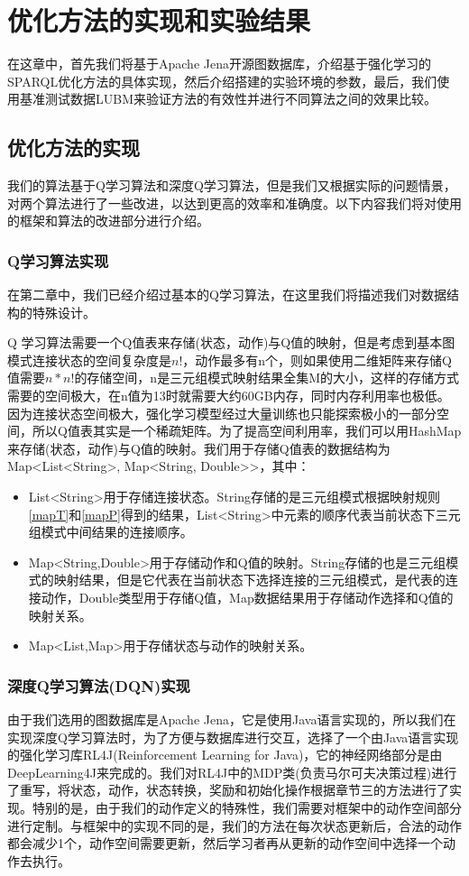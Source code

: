 \chapter{优化方法的实现和实验结果}
在这章中，首先我们将基于Apache Jena开源图数据库，介绍基于强化学习的SPARQL优化方法的具体实现，然后介绍搭建的实验环境的参数，最后，我们使用基准测试数据LUBM来验证方法的有效性并进行不同算法之间的效果比较。
\section{优化方法的实现}
我们的算法基于Q学习算法和深度Q学习算法，但是我们又根据实际的问题情景，对两个算法进行了一些改进，以达到更高的效率和准确度。以下内容我们将对使用的框架和算法的改进部分进行介绍。
\subsection{Q学习算法实现}
在第二章中，我们已经介绍过基本的Q学习算法，在这里我们将描述我们对数据结构的特殊设计。

Q 学习算法需要一个Q值表来存储(状态，动作)与Q值的映射，但是考虑到基本图模式连接状态的空间复杂度是$n!$，动作最多有n个，则如果使用二维矩阵来存储Q值需要$n*n!$的存储空间，n是三元组模式映射结果全集M的大小，这样的存储方式需要的空间极大，在n值为13时就需要大约60GB内存，同时内存利用率也极低。因为连接状态空间极大，强化学习模型经过大量训练也只能探索极小的一部分空间，所以Q值表其实是一个稀疏矩阵。为了提高空间利用率，我们可以用HashMap来存储(状态，动作)与Q值的映射。我们用于存储Q值表的数据结构为Map<List<String>, Map<String, Double>>，其中：
\begin{itemize}
    \item List<String>用于存储连接状态。String存储的是三元组模式根据映射规则\ref{mapT}和\ref{mapP}得到的结果，List<String>中元素的顺序代表当前状态下三元组模式中间结果的连接顺序。
    \item Map<String,Double>用于存储动作和Q值的映射。String存储的也是三元组模式的映射结果，但是它代表在当前状态下选择连接的三元组模式，是代表的连接动作，Double类型用于存储Q值，Map数据结果用于存储动作选择和Q值的映射关系。
    \item Map<List,Map>用于存储状态与动作的映射关系。
\end{itemize}

\subsection{深度Q学习算法(DQN)实现}
由于我们选用的图数据库是Apache Jena，它是使用Java语言实现的，所以我们在实现深度Q学习算法时，为了方便与数据库进行交互，选择了一个由Java语言实现的强化学习库RL4J(Reinforcement Learning for Java)，它的神经网络部分是由DeepLearning4J来完成的。我们对RL4J中的MDP类(负责马尔可夫决策过程)进行了重写，将状态，动作，状态转换，奖励和初始化操作根据章节三的方法进行了实现。特别的是，由于我们的动作定义的特殊性，我们需要对框架中的动作空间部分进行定制。与框架中的实现不同的是，我们的方法在每次状态更新后，合法的动作都会减少1个，动作空间需要更新，然后学习者再从更新的动作空间中选择一个动作去执行。

